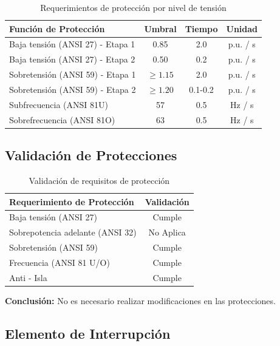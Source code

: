 \begin{table}[H]
    \centering
    \caption{Requerimientos de protección por nivel de tensión}
    \begin{tabular}{lccc}
    \toprule
    \textbf{Función de Protección} & \textbf{Umbral} & \textbf{Tiempo} & \textbf{Unidad} \\
    \midrule
    Baja tensión (ANSI 27) - Etapa 1 & 0.85 & 2.0 & p.u. / s \\
    Baja tensión (ANSI 27) - Etapa 2 & 0.50 & 0.2 & p.u. / s \\
    Sobretensión (ANSI 59) - Etapa 1 & $\geq 1.15$ & 2.0 & p.u. / s \\
    Sobretensión (ANSI 59) - Etapa 2 & $\geq 1.20$ & 0.1-0.2 & p.u. / s \\
    Subfrecuencia (ANSI 81U) & 57 & 0.5 & Hz / s \\
    Sobrefrecuencia (ANSI 81O) & 63 & 0.5 & Hz / s \\
    \bottomrule
    \end{tabular}
\end{table}

\subsection{Validación de Protecciones}

\begin{table}[H]
    \centering
    \caption{Validación de requisitos de protección}
    \begin{tabular}{lc}
    \toprule
    \textbf{Requerimiento de Protección} & \textbf{Validación} \\
    \midrule
    Baja tensión (ANSI 27) & Cumple \\
    Sobrepotencia adelante (ANSI 32) & No Aplica \\
    Sobretensión (ANSI 59) & Cumple \\
    Frecuencia (ANSI 81 U/O) & Cumple \\
    Anti - Isla & Cumple \\
    \bottomrule
    \end{tabular}
\end{table}

\textbf{Conclusión:} No es necesario realizar modificaciones en las protecciones.

\subsection{Elemento de Interrupción}

